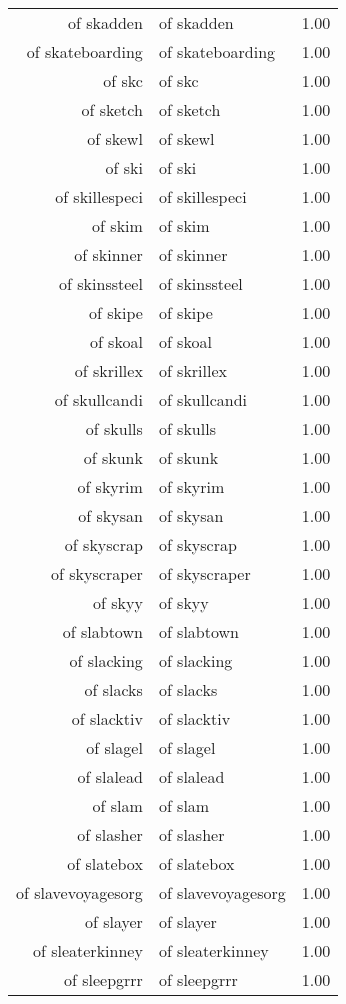 \begin{table}[ht]
\begin{tabular}{rlr}
  of skadden & of skadden & 1.00 \\ 
  of skateboarding & of skateboarding & 1.00 \\ 
  of skc & of skc & 1.00 \\ 
  of sketch & of sketch & 1.00 \\ 
  of skewl & of skewl & 1.00 \\ 
  of ski & of ski & 1.00 \\ 
  of skillespeci & of skillespeci & 1.00 \\ 
  of skim & of skim & 1.00 \\ 
  of skinner & of skinner & 1.00 \\ 
  of skinssteel & of skinssteel & 1.00 \\ 
  of skipe & of skipe & 1.00 \\ 
  of skoal & of skoal & 1.00 \\ 
  of skrillex & of skrillex & 1.00 \\ 
  of skullcandi & of skullcandi & 1.00 \\ 
  of skulls & of skulls & 1.00 \\ 
  of skunk & of skunk & 1.00 \\ 
  of skyrim & of skyrim & 1.00 \\ 
  of skysan & of skysan & 1.00 \\ 
  of skyscrap & of skyscrap & 1.00 \\ 
  of skyscraper & of skyscraper & 1.00 \\ 
  of skyy & of skyy & 1.00 \\ 
  of slabtown & of slabtown & 1.00 \\ 
  of slacking & of slacking & 1.00 \\ 
  of slacks & of slacks & 1.00 \\ 
  of slacktiv & of slacktiv & 1.00 \\ 
  of slagel & of slagel & 1.00 \\ 
  of slalead & of slalead & 1.00 \\ 
  of slam & of slam & 1.00 \\ 
  of slasher & of slasher & 1.00 \\ 
  of slatebox & of slatebox & 1.00 \\ 
  of slavevoyagesorg & of slavevoyagesorg & 1.00 \\ 
  of slayer & of slayer & 1.00 \\ 
  of sleaterkinney & of sleaterkinney & 1.00 \\ 
  of sleepgrrr & of sleepgrrr & 1.00 \\ 

\end{tabular}
\end{table}
